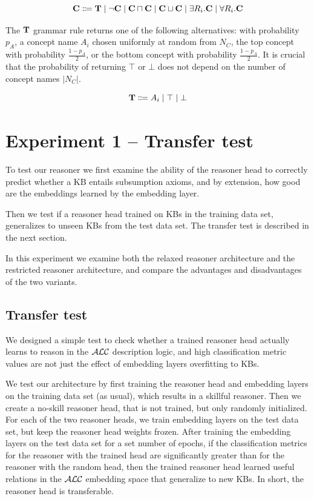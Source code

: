 \begin{equation}
\label{eq:alc-concept-grammar}
\mathbf{C} \Coloneqq \mathbf{T} \mid \lnot \mathbf{C} \mid \mathbf{C} \sqcap \mathbf{C} \mid \mathbf{C} \sqcup \mathbf{C} \mid \exists R_i . \mathbf{C} \mid \forall R_i . \mathbf{C}
\end{equation}

The $\mathbf{T}$ grammar rule returns one of the following alternatives: with probability $p_A$, a concept name $A_i$ chosen uniformly at random from $N_C$, the top concept with probability $\frac{1 - p_A}{2}$, or the bottom concept with probability $\frac{1 - p_A}{2}$.
It is crucial that the probability of returning $\top$ or $\bot$ does not depend on the number of concept names $|N_C|$.

\begin{equation}
\label{eq:alc-terminal-grammar}
\mathbf{T} \Coloneqq A_i \mid \top \mid \bot
\end{equation}

\section{Experiment 1 -- Transfer test}

To test our reasoner we first examine the ability of the reasoner head to correctly predict whether a KB entails subsumption axioms, and by extension, how good are the embeddings learned by the embedding layer.

Then we test if a reasoner head trained on KBs in the training data set, generalizes to unseen KBs from the test data set.
The transfer test is described in the next section.

In this experiment we examine both the relaxed reasoner architecture and the restricted reasoner architecture, and compare the advantages and disadvantages of the two variants.

\subsection{Transfer test}

We designed a simple test to check whether a trained reasoner head actually learns to reason in the $\mathcal{ALC}$ description logic, and high classification metric values are not just the effect of embedding layers overfitting to KBs.

We test our architecture by first training the reasoner head and embedding layers on the training data set (as usual), which results in a skillful reasoner.
Then we create a no-skill reasoner head, that is not trained, but only randomly initialized.
For each of the two reasoner heads, we train embedding layers on the test data set, but keep the reasoner head weights frozen.
After training the embedding layers on the test data set for a set number of epochs, if the classification metrics for the reasoner with the trained head are significantly greater than for the reasoner with the random head, then the trained reasoner head learned useful relations in the $\mathcal{ALC}$ embedding space that generalize to new KBs.
In short, the reasoner head is transferable.

